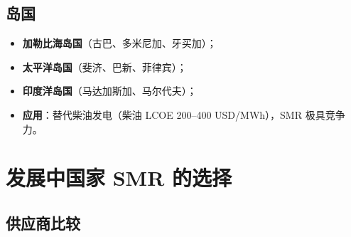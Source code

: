 \documentclass[
  UTF8,
  scheme=plain,
  fontsize=10pt,
  openany
]{ctexbook}
\begin{document}
\subsection{岛国}\label{ux5c9bux56fd}

\begin{itemize}
\tightlist
\item
  \textbf{加勒比海岛国}（古巴、多米尼加、牙买加）；
\item
  \textbf{太平洋岛国}（斐济、巴新、菲律宾）；
\item
  \textbf{印度洋岛国}（马达加斯加、马尔代夫）；
\item
  \textbf{应用}：替代柴油发电（柴油 LCOE 200--400 USD/MWh），SMR
  极具竞争力。
\end{itemize}

\section{发展中国家 SMR
的选择}\label{ux53d1ux5c55ux4e2dux56fdux5bb6-smr-ux7684ux9009ux62e9}

\subsection{供应商比较}\label{ux4f9bux5e94ux5546ux6bd4ux8f83}
\end{document}
